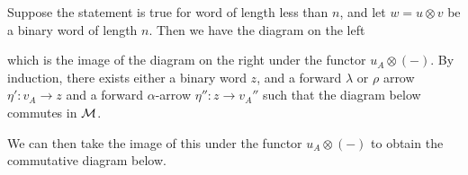 \begin{varprf}
    Suppose the statement 
    is true for word of length less than $n$, and let $w = u\otimes v$
    be a binary word of length $n$. Then we have the diagram on the left
    \begin{center}
        \hspace{1cm}
    \end{center}
    which is the image of the diagram on the right under 
    the functor $u_A \otimes (-)$. By induction, there exists either a binary 
    word $z$, and a 
    forward $\lambda$ or $\rho$ arrow $\eta': v_A \to z$ and 
    a forward $\alpha$-arrow $\eta'': z \to v_A''$ such that the diagram below commutes in 
    $\mm$. 
    \begin{center}
    \end{center}
    We can then take the image of this under the functor $u_A\otimes (-)$ to obtain the 
    commutative diagram below.
    \begin{center}
        \begin{tikzcd}[column sep = 1.4cm, row sep = 1cm]

\end{tikzcd}
\end{center}
\end{varprf}
